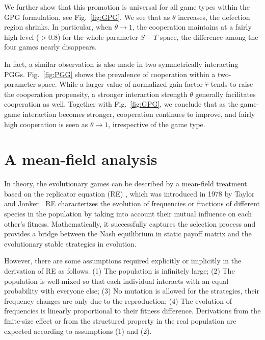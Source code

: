 \documentclass[showpacs,superscriptaddress,reprint,nofootinbib,amsmath,amssymb,aps,pre]{revtex4-1}
\begin{document}
We further show that this promotion is universal for all game types within the GPG formulation, see Fig.~\ref{fig:GPG}. We see that as $\theta$ increases, the defection region shrinks. In particular, when $\theta\rightarrow1$, the cooperation maintains at a fairly high level ($> 0.8$) for the whole parameter $S-T$ space, the difference among the four games nearly disappears. 

In fact, a similar observation is also made in two symmetrically interacting PGGs.
Fig.~{\ref{fig:PGG}} shows the prevalence of cooperation within a two-parameter space. While a larger value of normalized gain factor $\hat{r}$ tends to raise the cooperation propensity, a stronger interaction strength $\theta$ generally facilitates cooperation as well.
Together with Fig.~\ref{fig:GPG}, we conclude that as the game-game interaction becomes stronger, cooperation continues to improve, and fairly high cooperation is seen as $\theta\rightarrow1$, irrespective of the game type.

\section{A mean-field analysis}\label{sec:MF}
In theory, the evolutionary games can be described by a mean-field treatment based on the replicator equation (RE) \cite{roca2009evolutionary}, which was introduced in 1978 by Taylor and Jonker \cite{taylor1978evolutionary}. RE characterizes the evolution of frequencies or fractions of different species in the population by taking into account their mutual influence on each other's fitness. Mathematically, it successfully captures the selection process and provides a bridge between the Nash equilibrium in static payoff matrix and the evolutionary stable strategies in evolution. 

However, there are some assumptions required explicitly or implicitly in the derivation of RE as follows. (1) The population is infinitely large; (2) The population is well-mixed so that each individual interacts with an equal probability with everyone else; (3) No mutation is allowed for the strategies, their frequency changes are only due to the reproduction; (4) The evolution of frequencies is linearly proportional to their fitness difference. Derivations from the finite-size effect or from the structured property in the real population are expected according to assumptions (1) and (2).
\end{document}

